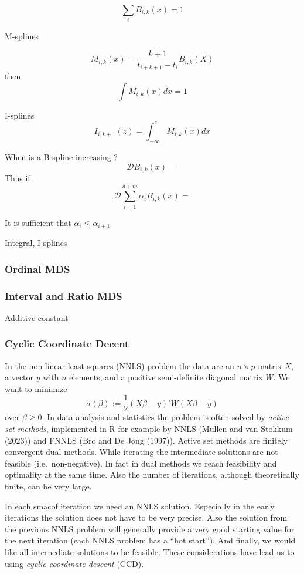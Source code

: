 \documentclass[
  12pt,
]{article}
\begin{document}
\[
\sum_i B_{i,k}(x)=1
\]

M-splines

\[
M_{i,k}(x)=\frac{k+1}{t_{i+k+1}-t_i}B_{i,k}(X)
\] then \[
\int M_{i,k}(x)dx=1
\]

I-splines \[
I_{i,k+1}(z)=\int_{-\infty}^zM_{i,k}(x)dx
\]

When is a B-spline increasing ? \[
\mathcal{D}B_{i,k}(x)=
\] Thus if \[
\mathcal{D}\sum_{i=1}^{d+m}\alpha_iB_{i,k}(x)=
\]

It is sufficient that \(\alpha_i\leq\alpha_{i+1}\)

Integral, I-splines

\subsubsection{Ordinal MDS}\label{ordinal-mds}

\subsubsection{Interval and Ratio MDS}\label{interval-and-ratio-mds}

Additive constant

\subsubsection{Cyclic Coordinate Decent}\label{cyclic-coordinate-decent}

In the non-linear least squares (NNLS) problem the data are an
\(n\times p\) matrix \(X\), a vector \(y\) with \(n\) elements, and a positive
semi-definite diagonal matrix \(W\). We want to minimize \[
\sigma(\beta):=\frac12(X\beta-y)'W(X\beta-y)
\] over \(\beta\geq 0\). In data analysis and statistics the problem is
often solved by \emph{active set methods}, implemented in R for example by
NNLS (Mullen and van Stokkum (2023)) and FNNLS (Bro and De Jong (1997)). Active set
methods are finitely convergent dual methods. While iterating the
intermediate solutions are not feasible (i.e.~non-negative). In fact in
dual methods we reach feasibility and optimality at the same time. Also
the number of iterations, although theoretically finite, can be very
large.

In each smacof iteration we need an NNLS solution. Especially in the
early iterations the solution does not have to be very precise. Also the
solution from the previous NNLS problem will generally provide a very
good starting value for the next iteration (each NNLS problem has a ``hot
start''). And finally, we would like all internediate solutions to be
feasible. These considerations have lead us to using \emph{cyclic coordinate
descent} (CCD).
\end{document}
